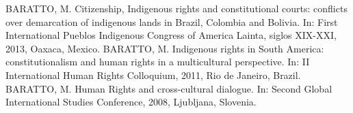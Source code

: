 %


\begin{cvcitems}
  \cvcitem
      {BARATTO, M.}
      {Citizenship, Indigenous rights and constitutional courts: conflicts over demarcation of indigenous lands in Brazil, Colombia and Bolivia. In: First International Pueblos Indigenous Congress of America Lainta, siglos XIX-XXI, 2013, Oaxaca, Mexico.}
  \cvcitem
      {BARATTO, M.}
      {Indigenous rights in South America: constitutionalism and human rights in a multicultural perspective. In: II International Human Rights Colloquium, 2011, Rio de Janeiro, Brazil.}
  \cvcitem
      {BARATTO, M.}
      {Human Rights and cross-cultural dialogue. In: Second Global International Studies Conference, 2008, Ljubljana, Slovenia.}
\end{cvcitems}

%

